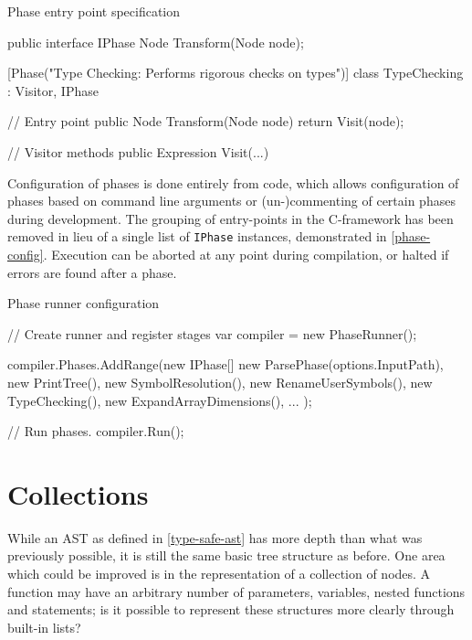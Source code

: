 \documentclass[twoside,openright]{uva-bachelor-thesis}
\newcommand{\code}[1]{\texttt{\footnotesize#1}}
\begin{document}
		\begin{codebox}[label=iphase]{Phase entry point specification}
			\begin{csharpcode}
				public interface IPhase
				{
					Node Transform(Node node);
				}
				
				[Phase("Type Checking: Performs rigorous checks on types")]
				class TypeChecking : Visitor, IPhase
				{
					// Entry point
					public Node Transform(Node node)
					{
						return Visit(node);
					}
					
					// Visitor methods
					public Expression Visit(...)
				}
			\end{csharpcode}
		\end{codebox}
		
		Configuration of phases is done entirely from code, which allows configuration of phases based on command line arguments or (un-)commenting of certain phases during development. The grouping of entry-points in the C-framework has been removed in lieu of a single list of \code{IPhase} instances, demonstrated in \cref{phase-config}. Execution can be aborted at any point during compilation, or halted if errors are found after a phase.
		
		\begin{codebox}[label=phase-config]{Phase runner configuration}
			\begin{csharpcode}
				// Create runner and register stages
				var compiler = new PhaseRunner();
				
				compiler.Phases.AddRange(new IPhase[]
				{
					new ParsePhase(options.InputPath),
					new PrintTree(),
					new SymbolResolution(),
					new RenameUserSymbols(),
					new TypeChecking(),
					new ExpandArrayDimensions(),
					...
				});
				
				// Run phases.
				compiler.Run();
			\end{csharpcode}
		\end{codebox}
	
	
	\section{Collections}
		While an AST as defined in \cref{type-safe-ast} has more depth than what was previously possible, it is still the same basic tree structure as before. One area which could be improved is in the representation of a collection of nodes. A function may have an arbitrary number of parameters, variables, nested functions and statements; is it possible to represent these structures more clearly through built-in lists?
		
\end{document}
